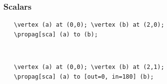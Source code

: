 \documentclass[10pt,letterpaper,twoside,notitlepage]{article}
\numberwithin{figure}{section}
\begin{document}
\subsubsection*{Scalars}
%
\begin{minipage}{0.7\linewidth}
\vercol\begin{verbatim}
   \vertex (a) at (0,0); \vertex (b) at (2,0);
   \propag[sca] (a) to (b);
\end{verbatim}\txcol
\end{minipage}
%
\begin{minipage}{0.25\linewidth}
\end{minipage}
\\
%
\begin{minipage}{0.7\linewidth}
\vercol\begin{verbatim}
   \vertex (a) at (0,0); \vertex (b) at (2,1);
   \propag[sca] (a) to [out=0, in=180] (b);
\end{verbatim}\txcol
\end{minipage}
%
\begin{minipage}{0.25\linewidth}
\end{minipage}
\\
%
\vspace{-6mm}
\end{document}
